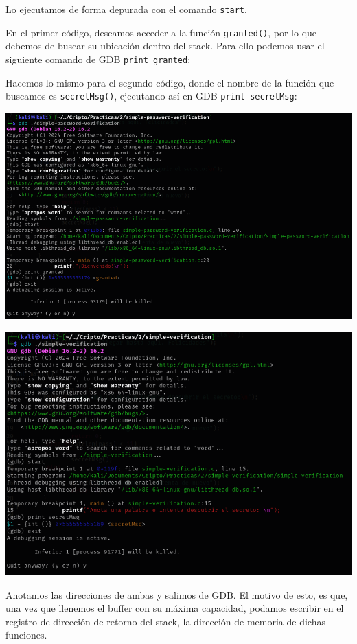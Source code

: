 Lo ejecutamos de forma depurada con el comando \texttt{start}.

En el primer código, deseamos acceder a la función \texttt{granted()}, por lo que debemos de buscar su ubicación dentro del stack. Para ello podemos usar el siguiente comando de GDB \texttt{print granted}:

Hacemos lo mismo para el segundo código, donde el nombre de la función que buscamos es \texttt{secretMsg()}, ejecutando así en GDB \texttt{print secretMsg}:

\begin{center}
    \includegraphics[scale=.5]{img/gdbPassword.png}
\end{center}

\begin{center}
    \includegraphics[scale=.5]{img/gdbVerification.png}
\end{center}

Anotamos las direcciones de ambas y salimos de GDB. El motivo de esto, es que, una vez que llenemos el buffer con su máxima capacidad, podamos escribir en el registro de dirección de retorno del stack, la dirección de memoria de dichas funciones.

